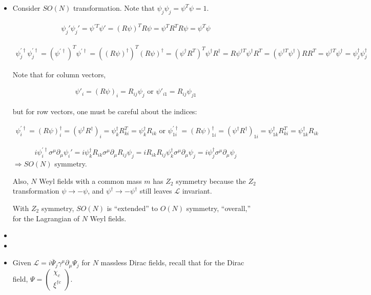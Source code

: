 \documentclass[twoside]{amsart}
\newcommand{\solutionhead}[1]
  {\smallskip
   \noindent{\large\bf Solution #1.}
   }
\begin{document}
\solutionhead{36.5} 
\begin{itemize}
\item[(a)] Consider $SO(N)$ transformation.  Note that $\psi_j \psi_j = \psi^T \psi = 1$.  

\[
\begin{gathered}
  \psi_j' \psi_j' = \psi^{'T} \psi' = (R\psi)^T R\psi = \psi^T R^T R \psi = \psi^T \psi
\end{gathered}
\]

\[
\begin{gathered}
  \psi^{'\dag}_j \psi^{'\dag}_j = (\psi^{' \dag})^T \psi^{'\dag} = ((R\psi)^{\dag})^T (R\psi)^{\dag} = (\psi^{\dag} R^T)^T \psi^{\dag} R^{\dag} = R\psi^{\dag T} \psi^{\dag} R^T = (\psi^{\dag T} \psi^{\dag}) R R^T = \psi^{\dag T} \psi^{\dag} = \psi^{\dag}_j \psi_j^{\dag}
\end{gathered}
\]

Note that for column vectors, 

\[
\begin{gathered}
\psi'_i = (R\psi)_i  = R_{ij} \psi_j \text{ or }  
 \psi'_{i1} = R_{ij} \psi_{j1}
\end{gathered}
\]

but for row vectors, one must be careful about the indices:

\[
\begin{gathered}
  \psi^{ ' \dag}_i = (R\psi)_i^{\dag} = (\psi^{\dag} R^{\dag})_i = \psi_k^{\dag} R^T_{ki} = \psi^{\dag}_{k} R_{ik} \text{ or }  
  \psi^{' \dag}_{1i} = (R\psi)_{1i}^{\dag} = (\psi^{\dag} R^{\dag})_{1i} = \psi_{1k}^{\dag} R^T_{ki} = \psi^{\dag}_{1k}R_{ik}
\end{gathered}
\]

\[
i \psi^{' \dag}_i \sigma^{\mu} \partial_{\mu} \psi_i' = i \psi^{\dag}_k R_{ik} \sigma^{\mu} \partial_{\mu} R_{ij} \psi_j = i R_{ik} R_{ij} \psi^{\dag}_k \sigma^{\mu} \partial_{\mu} \psi_j = i \psi^{\dag}_j \sigma^{\mu} \partial_{\mu} \psi_j
\]
$\Longrightarrow SO(N)$ symmetry.  

Also, $N$ Weyl fields with a common mass $m$ has $Z_2$ symmetry because the $Z_2$ transformation $\psi \to -\psi$, and $\psi^{\dag} \to - \psi^{\dag}$ still leaves $\mathcal{L}$ invariant.  

With $Z_2$ symmetry, $SO(N)$ is ``extended'' to $O(N)$ symmetry, ``overall,'' for the Lagrangian of $N$ Weyl fields.  
\item[(b)] 
\item[(c)]
\item[(d)] Given $\mathcal{L} = i \overline{\Psi}_j \gamma^{\mu} \partial_{\mu} \Psi_j$ for $N$ massless Dirac fields, recall that for the Dirac field, $\Psi = \left( \begin{matrix} \chi_c \\ \xi^{\dag \dot{c}} \end{matrix} \right)$.  


\end{itemize}
\end{document}
